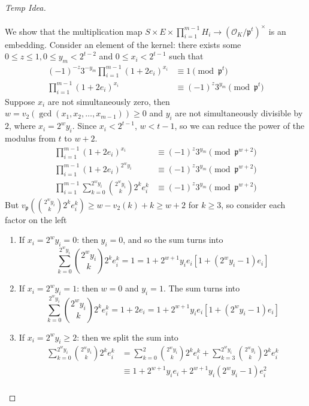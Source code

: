 \documentclass{treatise}
\begin{document}
\begin{shaded}
\begin{proof}[Temp Idea]
\\
\\
We show that the multiplication map $S \times E \times \prod_{i = 1}^{m - 1} H_i \to (\mathcal{O}_K / \mathfrak{p}^t)^\times$ is an embedding. Consider an element of the kernel: there exists some $0 \leq z \leq 1, 0 \leq y_m < 2^{t - 2}$ and $0 \leq x_i < 2^{t - 1}$ such that
\begin{align*}
(-1)^{-z} 3^{-y_m} \prod_{i = 1}^{m - 1} (1 + 2 e_i)^{x_i} & \equiv 1 \pmod{\mathfrak{p}^t} \\
\prod_{i = 1}^{m - 1} (1 + 2 e_i)^{x_i} & \equiv (-1)^z 3^{y_m} \pmod{\mathfrak{p}^t}
\end{align*}
Suppose $x_i$ are not simultaneously zero, then $w = v_2 (\gcd(x_1, x_2, \hdots, x_{m - 1})) \geq 0$ and $y_i$ are not simultaneously divisible by $2$, where $x_i = 2^w y_i$. Since $x_i < 2^{t - 1}$, $w < t - 1$, so we can reduce the power of the modulus from $t$ to $w + 2$.
\begin{align*}
\prod_{i = 1}^{m - 1} (1 + 2 e_i)^{x_i} & \equiv (-1)^z 3^{y_m} \pmod{\mathfrak{p}^{w + 2}} \\
\prod_{i = 1}^{m - 1} (1 + 2 e_i)^{2^w y_i} & \equiv (-1)^z 3^{y_m} \pmod{\mathfrak{p}^{w + 2}} \\
\prod_{i = 1}^{m - 1} \sum_{k = 0}^{2^w y_i} {2^w y_i \choose k} 2^k e_i^k & \equiv (-1)^z 3^{y_m} \pmod{\mathfrak{p}^{w + 2}}
\end{align*}
But $v_\mathfrak{p} \left( {2^w y_i \choose k} 2^k e_i^k \right) \geq w - v_2 (k) + k \geq w + 2$ for $k \geq 3$, so consider each factor on the left
\begin{enumerate}
	\item If $x_i = 2^w y_i = 0$: then $y_i = 0$, and so the sum turns into
	$$\sum_{k = 0}^{2^w y_i} {2^w y_i \choose k} 2^k e_i^k = 1 = 1 + 2^{w + 1} y_i e_i \left[ 1 + (2^w y_i - 1) e_i \right]$$
	\item If $x_i = 2^w y_i = 1$: then $w = 0$ and $y_i = 1$. The sum turns into
	$$\sum_{k = 0}^{2^w y_i} {2^w y_i \choose k} 2^k e_i^k = 1 + 2 e_i = 1 + 2^{w + 1} y_i e_i \left[ 1 + (2^w y_i - 1) e_i \right]$$
	\item If $x_i = 2^w y_i \geq 2$: then we split the sum into
	\begin{align*}
	\sum_{k = 0}^{2^w y_i} {2^w y_i \choose k} 2^k e_i^k & = \sum_{k = 0}^2 {2^w y_i \choose k} 2^k e_i^k + \sum_{k = 3}^{2^w y_i} {2^w y_i \choose k} 2^k e_i^k \\
	& \equiv 1 + 2^{w + 1} y_i e_i + 2^{w + 1} y_i (2^w y_i - 1) e_i^2 \\

\end{align*}
\end{enumerate}
\end{proof}
\end{shaded}
\end{document}
